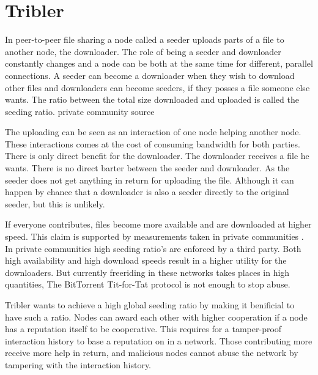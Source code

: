 \section{Tribler}
In peer-to-peer file sharing a node called a seeder uploads parts 
of a file to another node, the downloader. 
The role of being a seeder and downloader constantly changes 
and a node can be both at the same time for different, parallel connections.
A seeder can become a downloader when they wish to download other files
and downloaders can become seeders,
if they posses a file someone else wants.
The ratio between the total size downloaded and uploaded is called the seeding ratio\cite{Cohen-bittorrent}.
private community source

The uploading can be seen as an interaction of one node helping another node.
These interactions comes at the cost of consuming bandwidth for both parties.
There is only direct benefit for the downloader.
The downloader receives a file he wants.
There is no direct barter between the seeder and downloader.
As the seeder does not get anything in return for uploading the file.
Although it can happen by chance that a downloader is also a seeder directly to the original seeder,
but this is unlikely\cite{Lai-Incentives}.

If everyone contributes, files become more available and are downloaded at higher speed.
This claim is supported by measurements taken in private communities
\cite{meulpolder-privatecommunities}.
In private communities high seeding ratio's are enforced by a third party. 
Both high availability and high download speeds result in a higher utility for the downloaders.
But currently freeriding in these networks takes places in high quantities\cite{Adar-Freeriding}, 
The BitTorrent Tit-for-Tat protocol is not enough to stop abuse\cite{Pouwelse-tribler}.

Tribler wants to achieve a high global seeding ratio by making it benificial to have such a ratio.
Nodes can award each other with higher cooperation if a node has a reputation itself to be cooperative.
This requires for a tamper-proof interaction history to base a reputation on in a network.
Those contributing more receive more help in return, 
and malicious nodes cannot abuse the network by tampering with the interaction history.
